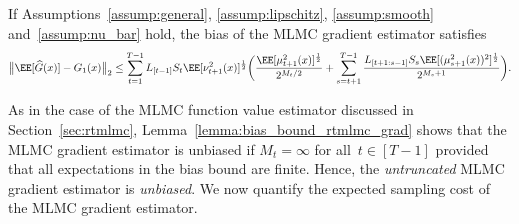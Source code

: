 \documentclass[11pt]{article}
\let\hat\widehat
\begin{document}
\begin{lemma}\label{lemma:bias_bound_rtmlmc_grad}
    If Assumptions~\ref{assump:general}, \ref{assump:lipschitz}, \ref{assump:smooth} and~\ref{assump:nu_bar} hold, the bias of the MLMC gradient estimator satisfies
    \begin{align*}
        \big\| \EE[\hat{G}(x)]- G_1(x) \big\|_2 \leq \sum_{t=1}^{T-1}L_{[t-1]}S_t \EE[\nu_{t+1}^{2}(x)]^\frac{1}{2}\bigg(  \frac{ \EE[\mu_{t+1}^{2}(x)]^\frac{1}{2}}{2^{M_t/2}}   + \sum_{s=t+1}^{T-1} \frac{L_{[t+1:s-1]}S_s\EE[(\mu_{s+1}^{2}(x))^2]^\frac{1}{2}}{2^{M_s+1}} \bigg).
    \end{align*}
\end{lemma}


As in the case of the MLMC function value estimator discussed in Section~\ref{sec:rtmlmc}, Lemma~\ref{lemma:bias_bound_rtmlmc_grad} shows that the MLMC gradient estimator is unbiased if $M_t=\infty$ for all~$t\in[T-1]$ provided that all expectations in the bias bound are finite. Hence, the \emph{untruncated} MLMC gradient estimator is \emph{unbiased}. We now quantify the expected sampling cost of the MLMC gradient estimator.
\end{document}

